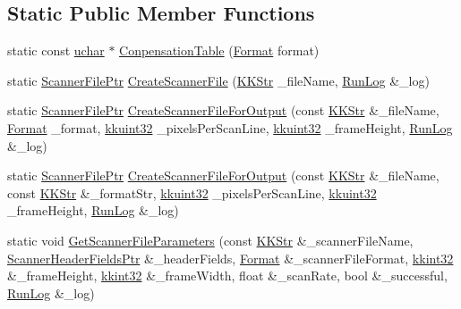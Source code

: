 \subsection*{Static Public Member Functions}
\begin{DoxyCompactItemize}
\item 
static const \hyperlink{namespace_k_k_b_ace9969169bf514f9ee6185186949cdf7}{uchar} $\ast$ \hyperlink{class_k_k_l_s_c_1_1_scanner_file_a3058d0421a6d7fe2e61e5ee2a75b9590}{Conpensation\+Table} (\hyperlink{class_k_k_l_s_c_1_1_scanner_file_a9eb976c9d084a94db71a5e8d1fadb903}{Format} format)
\item 
static \hyperlink{class_k_k_l_s_c_1_1_scanner_file_a4ce197a15dc3da96b2258d55f383db2d}{Scanner\+File\+Ptr} \hyperlink{class_k_k_l_s_c_1_1_scanner_file_ac741a288dbd5fb51d8210bde6cb64fb5}{Create\+Scanner\+File} (\hyperlink{class_k_k_b_1_1_k_k_str}{K\+K\+Str} \+\_\+file\+Name, \hyperlink{class_k_k_b_1_1_run_log}{Run\+Log} \&\+\_\+log)
\item 
static \hyperlink{class_k_k_l_s_c_1_1_scanner_file_a4ce197a15dc3da96b2258d55f383db2d}{Scanner\+File\+Ptr} \hyperlink{class_k_k_l_s_c_1_1_scanner_file_a018129381681168f1cc3822212488b41}{Create\+Scanner\+File\+For\+Output} (const \hyperlink{class_k_k_b_1_1_k_k_str}{K\+K\+Str} \&\+\_\+file\+Name, \hyperlink{class_k_k_l_s_c_1_1_scanner_file_a9eb976c9d084a94db71a5e8d1fadb903}{Format} \+\_\+format, \hyperlink{namespace_k_k_b_af8d832f05c54994a1cce25bd5743e19a}{kkuint32} \+\_\+pixels\+Per\+Scan\+Line, \hyperlink{namespace_k_k_b_af8d832f05c54994a1cce25bd5743e19a}{kkuint32} \+\_\+frame\+Height, \hyperlink{class_k_k_b_1_1_run_log}{Run\+Log} \&\+\_\+log)
\item 
static \hyperlink{class_k_k_l_s_c_1_1_scanner_file_a4ce197a15dc3da96b2258d55f383db2d}{Scanner\+File\+Ptr} \hyperlink{class_k_k_l_s_c_1_1_scanner_file_adc7248a39a5e76d48eaf219b5d6b72da}{Create\+Scanner\+File\+For\+Output} (const \hyperlink{class_k_k_b_1_1_k_k_str}{K\+K\+Str} \&\+\_\+file\+Name, const \hyperlink{class_k_k_b_1_1_k_k_str}{K\+K\+Str} \&\+\_\+format\+Str, \hyperlink{namespace_k_k_b_af8d832f05c54994a1cce25bd5743e19a}{kkuint32} \+\_\+pixels\+Per\+Scan\+Line, \hyperlink{namespace_k_k_b_af8d832f05c54994a1cce25bd5743e19a}{kkuint32} \+\_\+frame\+Height, \hyperlink{class_k_k_b_1_1_run_log}{Run\+Log} \&\+\_\+log)
\item 
static void \hyperlink{class_k_k_l_s_c_1_1_scanner_file_a116dbcb082fd94be10908c5f2ea8d099}{Get\+Scanner\+File\+Parameters} (const \hyperlink{class_k_k_b_1_1_k_k_str}{K\+K\+Str} \&\+\_\+scanner\+File\+Name, \hyperlink{namespace_k_k_l_s_c_a7c06efc9062d7120e1fbf26f44ce4089}{Scanner\+Header\+Fields\+Ptr} \&\+\_\+header\+Fields, \hyperlink{class_k_k_l_s_c_1_1_scanner_file_a9eb976c9d084a94db71a5e8d1fadb903}{Format} \&\+\_\+scanner\+File\+Format, \hyperlink{namespace_k_k_b_a8fa4952cc84fda1de4bec1fbdd8d5b1b}{kkint32} \&\+\_\+frame\+Height, \hyperlink{namespace_k_k_b_a8fa4952cc84fda1de4bec1fbdd8d5b1b}{kkint32} \&\+\_\+frame\+Width, float \&\+\_\+scan\+Rate, bool \&\+\_\+successful, \hyperlink{class_k_k_b_1_1_run_log}{Run\+Log} \&\+\_\+log)

\end{DoxyCompactItemize}
